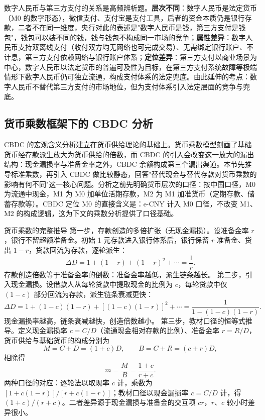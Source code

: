 数字人民币与第三方支付的关系是高频辨析题。\textbf{层次不同}：数字人民币是法定货币（M0 的数字形态），微信支付、支付宝是支付工具，后者的资金本质仍是银行存款，二者不在同一维度，央行对此的表述是"数字人民币是钱，第三方支付是钱包"，钱包可以装不同的钱，钱与钱包不构成同一市场的竞争；\textbf{属性差异}：数字人民币支持双离线支付（收付双方均无网络也可完成交易）、无需绑定银行账户、不计息，第三方支付依赖网络与银行账户体系；\textbf{定位差异}：第三方支付以商业场景为中心，数字人民币以法定货币的普遍可及性为目标，在第三方支付系统故障等极端情形下数字人民币仍可独立流通，构成支付体系的法定兜底。由此延伸的考点：数字人民币不替代第三方支付的市场地位，但为支付体系引入法定层面的竞争与兜底。

\subsection{货币乘数框架下的 CBDC 分析}

CBDC 的宏观含义分析建立在货币供给理论的基础上。货币乘数模型刻画了基础货币经存款派生放大为货币供给的倍数，而 CBDC 的引入会改变这一放大的漏出结构：现金漏损率与准备金率之外，CBDC 余额构成第三个漏出渠道。本节先推导标准乘数，再引入 CBDC 做比较静态，回答"替代现金与替代存款对货币乘数的影响有何不同"这一核心问题。分析之前先明确货币层次的口径：按中国口径，M0 为流通中现金，M1 为 M0 加单位活期存款，M2 为 M1 加准货币（定期存款、储蓄存款等）。CBDC 定位 M0 的直接含义是：e-CNY 计入 M0 口径，不改变 M1、M2 的构成逻辑，这为下文的乘数分析提供了口径基础。

\begin{derivation}{货币乘数的完整推导}{}
第一步，存款创造的多倍扩张（无现金漏损）。设准备金率 $r$，银行不留超额准备金。初始 1 元存款进入银行体系后，银行保留 $r$ 准备金、贷出 $1-r$，贷款回流为存款，逐轮派生：
\[
\Delta D = 1 + (1-r) + (1-r)^2 + \cdots = \frac{1}{r}.
\]
存款创造倍数等于准备金率的倒数：准备金率越低，派生链条越长。
第二步，引入现金漏损。设借款人从每轮贷款中提取现金的比例为 $c$，每轮贷款中仅 $(1-c)$ 部分回流为存款，派生链条衰减更快：
\[
\Delta D = 1 + (1-c)(1-r) + [(1-c)(1-r)]^2 + \cdots = \frac{1}{1-(1-c)(1-r)}.
\]
现金漏损率越高，链条衰减越快，创造倍数越小。
第三步，教材口径的恒等式推导。定义现金漏损率 $c = C/D$（流通现金相对存款的比例）、准备金率 $r = R/D$，货币供给与基础货币的构成分别为
\[
M = C + D = (1+c)D, \qquad B = C + R = (c+r)D,
\]
相除得
\[
m = \frac{M}{B} = \frac{1 + c}{r + c}.
\]
两种口径的对应：逐轮法以取现率 $c$ 计，乘数为 $[1+c(1-r)]/[r+c(1-r)]$；教材口径以现金漏损率 $c = C/D$ 计，得 $(1+c)/(r+c)$。二者差异源于现金漏损与准备金的交互项 $cr$，$r$、$c$ 较小时差异很小。
\end{derivation}

